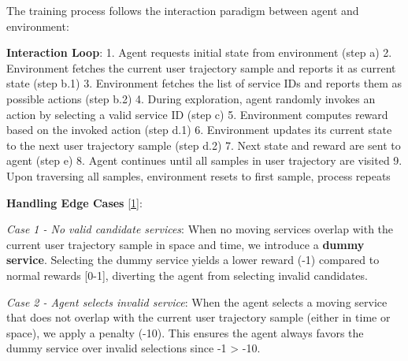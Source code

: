 The training process follows the interaction paradigm between agent and
environment:

\textbf{Interaction Loop}: 1. Agent requests initial state from
environment (step a) 2. Environment fetches the current user trajectory
sample and reports it as current state (step b.1) 3. Environment fetches
the list of service IDs and reports them as possible actions (step b.2)
4. During exploration, agent randomly invokes an action by selecting a
valid service ID (step c) 5. Environment computes reward based on the
invoked action (step d.1) 6. Environment updates its current state to
the next user trajectory sample (step d.2) 7. Next state and reward are
sent to agent (step e) 8. Agent continues until all samples in user
trajectory are visited 9. Upon traversing all samples, environment
resets to first sample, process repeats

\textbf{Handling Edge Cases} \hyperlink{cite.neiat2021}{\hyperlink{cite.neiat2021}{[1]}}:

\emph{Case 1 - No valid candidate services}: When no moving services
overlap with the current user trajectory sample in space and time, we
introduce a \textbf{dummy service}. Selecting the dummy service yields a
lower reward (-1) compared to normal rewards {[}0-1{]}, diverting the
agent from selecting invalid candidates.

\emph{Case 2 - Agent selects invalid service}: When the agent selects a
moving service that does not overlap with the current user trajectory
sample (either in time or space), we apply a penalty (-10). This ensures
the agent always favors the dummy service over invalid selections since
-1 \textgreater{} -10.

